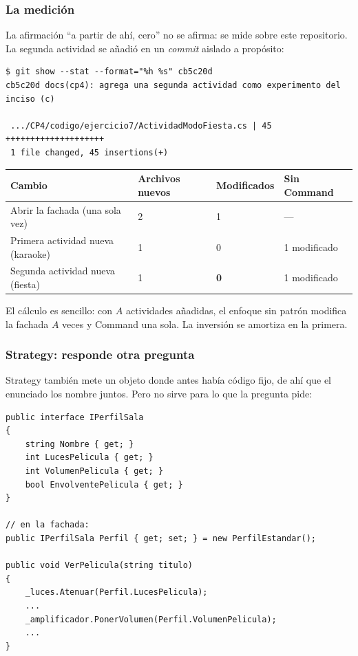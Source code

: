 \subsubsection*{La medición}

La afirmación ``a partir de ahí, cero'' no se afirma: se mide sobre este repositorio. La
segunda actividad se añadió en un \textit{commit} aislado a propósito:

{\small
\begin{verbatim}
$ git show --stat --format="%h %s" cb5c20d
cb5c20d docs(cp4): agrega una segunda actividad como experimento del inciso (c)

 .../CP4/codigo/ejercicio7/ActividadModoFiesta.cs | 45 ++++++++++++++++++++
 1 file changed, 45 insertions(+)
\end{verbatim}
}

\begin{table}[h!]
    \centering
    \small
    \begin{tabular}{p{5.4cm}p{2.6cm}p{2.6cm}p{3.0cm}}
        \toprule
        \textbf{Cambio} & \textbf{Archivos nuevos} & \textbf{Modificados}
        & \textbf{Sin Command} \\
        \midrule
        Abrir la fachada (una sola vez) & 2 & 1 & --- \\
        \addlinespace
        Primera actividad nueva (karaoke) & 1 & 0 & 1 modificado \\
        \addlinespace
        Segunda actividad nueva (fiesta) & 1 & \textbf{0} & 1 modificado \\
        \bottomrule
    \end{tabular}
\end{table}

El cálculo es sencillo: con $A$ actividades añadidas, el enfoque sin patrón modifica la
fachada $A$ veces y Command una sola. La inversión se amortiza en la primera.

\subsubsection*{Strategy: responde otra pregunta}

Strategy también mete un objeto donde antes había código fijo, de ahí que el enunciado los
nombre juntos. Pero no sirve para lo que la pregunta pide:

{\small
\begin{verbatim}
public interface IPerfilSala
{
    string Nombre { get; }
    int LucesPelicula { get; }
    int VolumenPelicula { get; }
    bool EnvolventePelicula { get; }
}

// en la fachada:
public IPerfilSala Perfil { get; set; } = new PerfilEstandar();

public void VerPelicula(string titulo)
{
    _luces.Atenuar(Perfil.LucesPelicula);
    ...
    _amplificador.PonerVolumen(Perfil.VolumenPelicula);
    ...
}
\end{verbatim}
}

